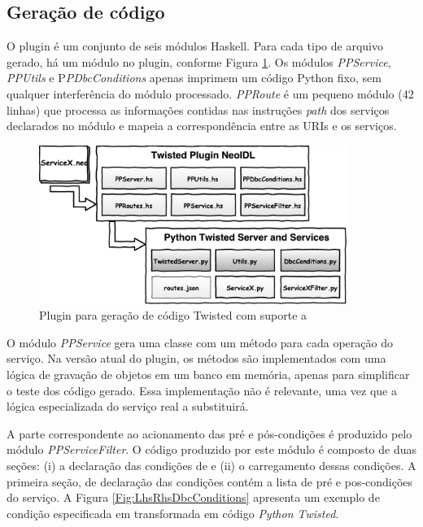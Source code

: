 \subsection{Geração de código}

O plugin \twisted{} é um conjunto de seis módulos Haskell. Para cada tipo de
arquivo gerado, há um módulo no plugin, conforme Figura \ref{PluginTwisted}. Os
módulos \emph{PPService}, \emph{PPUtils} e P\emph{PDbcConditions} apenas
imprimem um código Python fixo, sem qualquer interferência do módulo \neoidl{}
processado. \emph{PPRoute} é um pequeno módulo (42 linhas) que processa as
informações contidas nas instruções \emph{path} dos serviços declarados no
módulo \neoidl{} e mapeia a correspondência entre as URIs e os serviços.

\begin{figure}[!htb]
\centering
\includegraphics[width=100mm,trim = 0mm 0mm 0mm 
0mm,clip]{img/PluginTwisted.pdf}
\caption{Plugin para geração de código Twisted com suporte a \designbycontract{}}
\label{PluginTwisted}
\end{figure}

O módulo \emph{PPService} gera uma classe com um método para cada operação do
serviço. Na versão atual do plugin, os métodos são implementados com uma lógica
de gravação de objetos em um banco em memória, apenas para simplificar o teste
dos código gerado. Essa implementação não é relevante, uma vez que a lógica
especializada do serviço real a substituirá.

A parte correspondente ao acionamento das pré e pós-condições é produzido pelo
módulo \emph{PPServiceFilter}. O código produzido por este módulo é composto de
duas seções: (i) a declaração das condições de \designbycontract{} e (ii) o
carregamento dessas condições. A primeira seção, de declaração das condições
\designbycontract{} contém a lista de pré e pos-condições do serviço. A Figura 
\ref{Fig:LhsRhsDbcConditions} apresenta um exemplo de condição especificada em
\neoidl{} transformada em código \emph{Python Twisted}.

